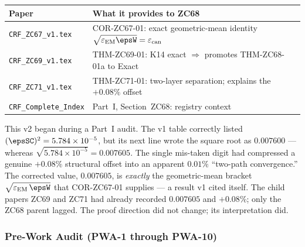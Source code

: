 \documentclass[12pt, a4paper]{article}
\renewcommand{\epsEM}{\varepsilon_{\rm EM}}
\renewcommand{\epscan}{\varepsilon_{\rm can}}
\begin{document}
\begin{keybox}[title={Companion Papers --- ZC68}]
{\small\renewcommand{\arraystretch}{1.25}
\begin{center}
\begin{tabular}{@{}p{5.0cm}p{7.5cm}@{}}
\toprule
\textbf{Paper} & \textbf{What it provides to ZC68} \\
\midrule
\texttt{CRF\_ZC67\_v1.tex}
  & COR-ZC67-01: exact geometric-mean identity $\sqrt{\epsEM\epsW}=\epscan$ \\
\texttt{CRF\_ZC69\_v1.tex}
  & THM-ZC69-01: K14 exact $\Rightarrow$ promotes THM-ZC68-01a to Exact \\
\texttt{CRF\_ZC71\_v1.tex}
  & THM-ZC71-01: two-layer separation; explains the $+0.08\%$ offset \\
\texttt{CRF\_Complete\_Index}
  & Part~I, Section~ZC68: registry context \\
\bottomrule
\end{tabular}
\end{center}}
\end{keybox}

\begin{derivedbox}[title={Discovery Note}]
This v2 began during a Part~I audit. The v1 table correctly listed
$(\epsSC)^2 = 5.784\times10^{-5}$, but its next line wrote the square
root as $0.007600$ --- whereas $\sqrt{5.784\times10^{-5}}=0.007605$.
The single mis-taken digit had compressed a genuine $+0.08\%$ structural
offset into an apparent $0.01\%$ ``two-path convergence.'' The corrected
value, $0.007605$, is \emph{exactly} the geometric-mean bracket
$\sqrt{\epsEM\,\epsW}$ that COR-ZC67-01 supplies --- a result v1 cited
itself. The child papers ZC69 and ZC71 had already recorded $0.007605$
and $+0.08\%$; only the ZC68 parent lagged. The proof direction did not
change; its interpretation did.
\end{derivedbox}

\subsubsection{Pre-Work Audit (PWA-1 through PWA-10)}
\end{document}

